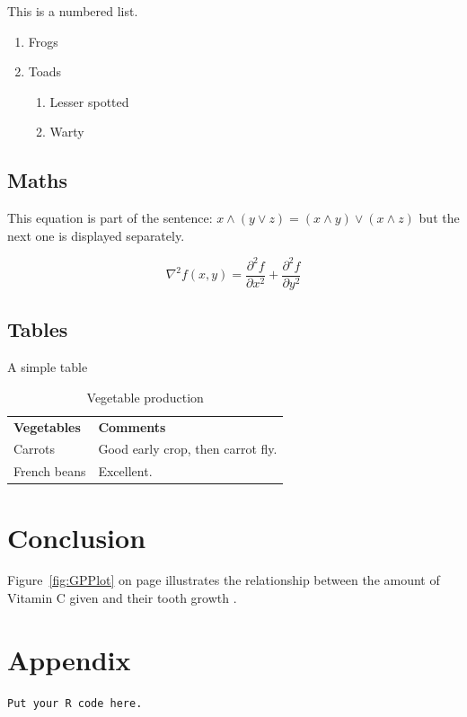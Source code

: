 \documentclass[a4paper,11pt]{article}
\begin{document}
This is a numbered list.
\begin{enumerate}
\item Frogs
\item Toads
\begin{enumerate}
\item Lesser spotted
\item Warty
\end{enumerate}
\end{enumerate}

\subsection{Maths}
This equation is part of the sentence: 
 $x\wedge (y\vee z) = (x\wedge y) \vee (x\wedge z)$ but the next one is
displayed separately.

$$\nabla^2 f(x,y) = \frac{\partial^2 f}{\partial x^2}
+ \frac{\partial^2 f}{\partial y^2}$$

\subsection{Tables}
A simple table

\begin{table}[htb]
\centering
\begin{tabular}{ll}
\textbf{Vegetables} & \textbf{Comments} \\
Carrots & Good early crop, then carrot fly. \\
French beans & Excellent.\\
\end{tabular}
\caption{Vegetable production}
\end{table}

\section{Conclusion}
Figure~\ref{fig:GPPlot} on page \pageref{fig:GPPlot} illustrates
the relationship between the amount of Vitamin C given and
their tooth growth \cite{Lamport}.

\clearpage
\section*{Appendix}
\begin{verbatim}
Put your R code here.
\end{verbatim}




\end{document}

